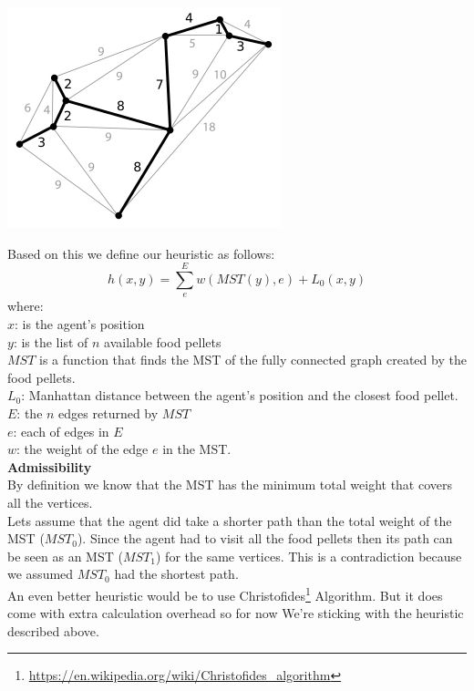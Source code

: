 \documentclass[11pt]{article}
\begin{document}
\begin{center}
\includegraphics[scale=1.1]{Minimum_spanning_tree.png}
\end{center}

Based on this we define our heuristic as follows:
\[ h(x, y) = \sum_{e}^{E} w(MST(y), e) + L_0(x, y)\]
where:\\
$x$: is the agent's position\\
$y$: is the list of $n$ available food pellets\\
$MST$ is a function that finds the MST of the fully connected graph created by the food pellets.\\
$L_0$: Manhattan distance between the agent's position and the closest food pellet.\\
$E$: the $n$ edges returned by $MST$\\
$e$: each of edges in $E$\\
$w$: the weight of the edge $e$ in the MST.\\

\textbf{Admissibility}\\
By definition we know that the MST has the minimum total weight that covers all the vertices.\\
Lets assume that the agent did take a shorter path than the total weight of the MST ($MST_0$). Since the agent had to visit all the food pellets then its path can be seen as an MST ($MST_1$) for the same vertices. This is a contradiction because we assumed $MST_0$ had the shortest path. \\

An even better heuristic would be to use Christofides\footnote{\url{https://en.wikipedia.org/wiki/Christofides_algorithm}} Algorithm. But it does come with extra calculation overhead so for now We're sticking with the heuristic described above.
\end{document}
